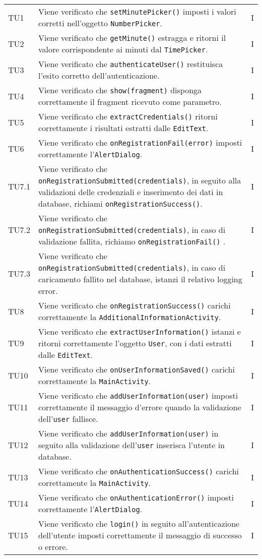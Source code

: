 \begin{longtable}{ >{\centering}p{}  >{\centering}p{} >{\centering}p{}
			}
		TU1 & Viene verificato che \texttt{setMinutePicker()} imposti i valori corretti nell'oggetto \texttt{NumberPicker}. & I  \tabularnewline		
		TU2 & Viene verificato che \texttt{getMinute()} estragga e ritorni il valore corrispondente ai minuti dal \texttt{TimePicker}. & I \tabularnewline	
		TU3 & Viene verificato che \texttt{authenticateUser()} restituisca l'esito corretto dell'autenticazione. & I 
		\tabularnewline	
		TU4 & Viene verificato che \texttt{show(fragment)} disponga correttamente il fragment ricevuto come parametro. & I 
		\tabularnewline	
		TU5 & Viene verificato che \texttt{extractCredentials()} ritorni correttamente i risultati estratti dalle \texttt{EditText}. & I \tabularnewline	
		TU6 & Viene verificato che \texttt{onRegistrationFail(error)} imposti correttamente l'\texttt{AlertDialog}. & I
		\tabularnewline	
		TU7.1 & Viene verificato che \texttt{onRegistrationSubmitted(credentials)}, in seguito alla validazioni delle credenziali e inserimento dei dati in database, richiami \texttt{onRegistrationSuccess()}. & I 
		\tabularnewline	
		TU7.2 & Viene verificato che \texttt{onRegistrationSubmitted(credentials)}, in caso di validazione fallita, richiamo \texttt{onRegistrationFail()} . & I 
		\tabularnewline	
		TU7.3 & Viene verificato che \texttt{onRegistrationSubmitted(credentials)}, in caso di caricamento fallito nel database, istanzi il relativo logging error. & I 
		\tabularnewline	
		TU8 & Viene verificato che \texttt{onRegistrationSuccess()} carichi correttamente la \texttt{AdditionalInformationActivity}. & I 
		\tabularnewline	
		TU9 & Viene verificato che \texttt{extractUserInformation()} istanzi e ritorni correttamente l'oggetto \texttt{User}, con i dati estratti dalle \texttt{EditText}. & I 
		\tabularnewline	
		TU10 & Viene verificato che \texttt{onUserInformationSaved()} carichi correttamente la \texttt{MainActivity}. & I 
				\tabularnewline	
		TU11 & Viene verificato che \texttt{addUserInformation(user)} imposti correttamente il messaggio d'errore quando la validazione dell'\texttt{user} fallisce. & I 
		\tabularnewline	
		TU12 & Viene verificato che \texttt{addUserInformation(user)} in seguito alla validazione dell'\texttt{user} inserisca l'utente in database. & I
		\tabularnewline	
		TU13 & Viene verificato che \texttt{onAuthenticationSuccess()} carichi correttamente la \texttt{MainActivity}. & I 
		\tabularnewline	
		TU14 & Viene verificato che \texttt{onAuthenticationError()} imposti correttamente l'\texttt{AlertDialog}. & I 
		\tabularnewline	
		TU15 & Viene verificato che \texttt{login()} in seguito all'autenticazione dell'utente imposti correttamente il messaggio di successo o errore. & I

\end{longtable}
